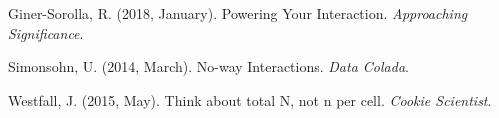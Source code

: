 \documentclass[,man,floatsintext]{apa6}
\begin{document}
\hypertarget{ref-giner-sorolla_powering_2018}{}
Giner-Sorolla, R. (2018, January). Powering Your Interaction.
\emph{Approaching Significance}.

\hypertarget{ref-simonsohn_no-way_2014}{}
Simonsohn, U. (2014, March). No-way Interactions. \emph{Data Colada}.

\hypertarget{ref-westfall_think_2015}{}
Westfall, J. (2015, May). Think about total N, not n per cell.
\emph{Cookie Scientist}.
\end{document}
